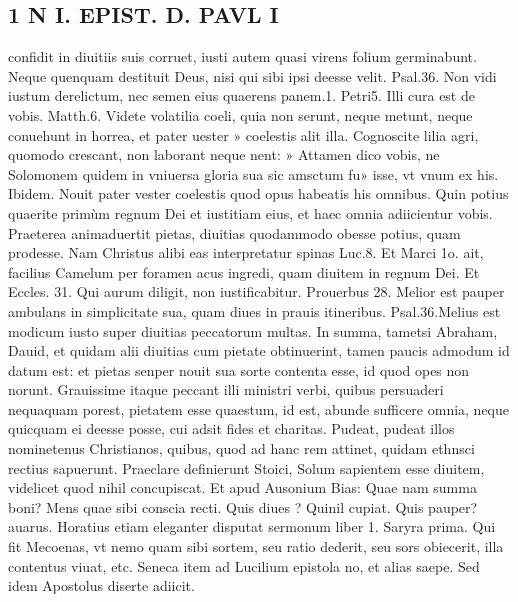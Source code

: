 \documentclass{article}
\begin{document}
\begin{pages}
\section*{1 N I. EPIST. D. PAVL I }
\marginpar{[ p.125 ]}\pstart confidit in diuitiis suis corruet, iusti autem quasi virens folium germinabunt. Neque quenquam destituit Deus, nisi qui sibi ipsi deesse velit. Psal.36. Non vidi iustum derelictum, nec semen eius quaerens panem.1. Petri5. Illi cura est de vobis. Matth.6. Videte volatilia coeli, quia non serunt, neque metunt, neque conuehunt in horrea, et pater uester » coelestis alit illa. Cognoscite lilia agri, quomodo crescant, non laborant neque nent: » Attamen dico vobis, ne Solomonem quidem in vniuersa gloria sua sic amsctum fu» isse, vt vnum ex his. Ibidem. Nouit pater vester coelestis quod opus habeatis his omnibus. Quin potius quaerite primùm regnum Dei et iustitiam eius, et haec omnia adiicientur vobis. Praeterea animaduertit pietas, diuitias quodammodo obesse potius, quam prodesse. Nam Christus alibi eas interpretatur spinas Luc.8. Et Marci 1o. ait, facilius Camelum per foramen acus ingredi, quam diuitem in regnum Dei. Et Eccles. 31. Qui aurum diligit, non iustificabitur. Prouerbus 28. Melior est pauper ambulans in simplicitate sua, quam diues in prauis itineribus. Psal.36.Melius est modicum iusto super diuitias peccatorum multas. In summa, tametsi Abraham, Dauid, et quidam alii diuitias cum pietate obtinuerint, tamen paucis admodum id datum est: et pietas senper nouit sua sorte contenta esse, id quod opes non norunt. Grauissime itaque peccant illi ministri verbi, quibus persuaderi nequaquam porest, pietatem esse quaestum, id est, abunde sufficere omnia, neque quicquam ei deesse posse, cui adsit fides et charitas. Pudeat, pudeat illos nominetenus Christianos, quibus, quod ad hanc rem attinet, quidam ethnsci rectius sapuerunt. Praeclare definierunt Stoici, Solum sapientem esse diuitem, videlicet quod nihil concupiscat. Et apud Ausonium Bias: Quae nam summa boni? Mens quae sibi conscia recti. Quis diues ? Quinil cupiat. Quis pauper? auarus. Horatius etiam eleganter disputat sermonum liber 1. Saryra prima. Qui fit Mecoenas, vt nemo quam sibi sortem, seu ratio dederit, seu sors obiecerit, illa contentus viuat, etc. Seneca item ad Lucilium epistola no, et alias saepe. Sed idem Apostolus diserte adiicit.  \pend
{}
{}

\end{pages}
\end{document}
